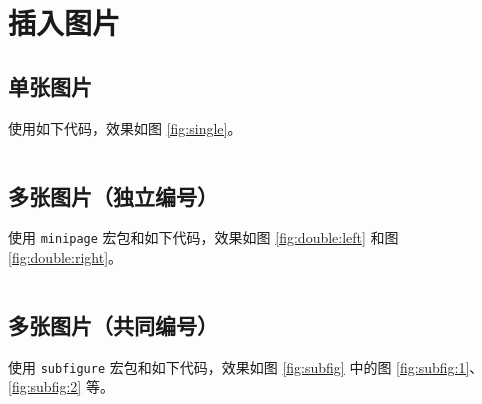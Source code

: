 \section{插入图片}
\subsection{单张图片}
使用如下代码，效果如图 \ref{fig:single}。

\inputminted{latex}{src/image-single.tex}


\newpage
\subsection{多张图片（独立编号）}
使用 \texttt{minipage} 宏包和如下代码，效果如图 \ref{fig:double:left} 和图 \ref{fig:double:right}。

\inputminted{latex}{src/image-double.tex}


\newpage
\subsection{多张图片（共同编号）}
使用 \texttt{subfigure} 宏包和如下代码，效果如图 \ref{fig:subfig} 中的图 \ref{fig:subfig:1}、\ref{fig:subfig:2} 等。

\inputminted{latex}{src/image-subfig.tex}

